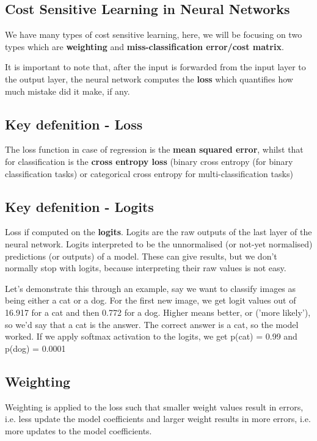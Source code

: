 \documentclass{article}
\begin{document}
\subsection{Cost Sensitive Learning in Neural Networks}
We have many types of cost sensitive learning, here, we will be focusing on two types which are \textbf{weighting} and \textbf{miss-classification error/cost matrix}.

It is important to note that, after the input is forwarded from the input layer to the output layer, the neural network computes the \textbf{loss} which quantifies how much mistake did it make, if any. 

\subsection*{Key defenition - Loss}
The loss function in case of regression is the \textbf{mean squared error}, whilst that for classification is the \textbf{cross entropy loss} (binary cross entropy (for binary classification tasks) or categorical cross entropy for multi-classification tasks)

\subsection*{Key defenition - Logits}
Loss if computed on the \textbf{logits}. Logits are the raw outputs of the last layer of the neural network. Logits interpreted to be the unnormalised (or not-yet normalised) predictions (or outputs) of a model. These can give results, but we don't normally stop with logits, because interpreting their raw values is not easy.

Let's demonstrate this through an example, say we want to classify images as being either a cat or a dog. For the first new image, we get logit values out of 16.917 for a cat and then 0.772 for a dog. Higher means better, or ('more likely'), so we'd say that a cat is the answer. The correct answer is a cat, so the model worked. If we apply softmax activation to the logits, we get p(cat) = 0.99 and p(dog) = 0.0001

\subsection*{Weighting}
Weighting is applied to the loss such that smaller weight values result in errors, i.e. less update the model coefficients and larger weight results in more errors, i.e. more updates to the model coefficients.
\end{document}
